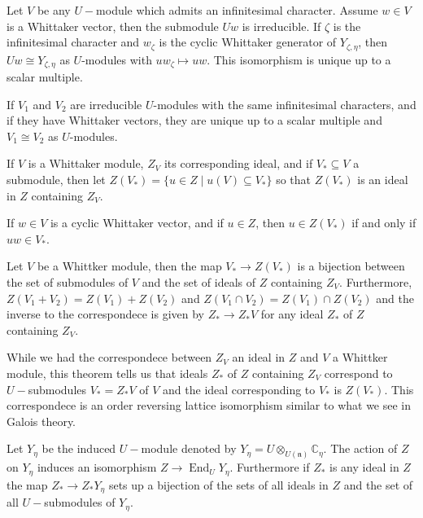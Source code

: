 \documentclass{article}
\DeclareMathOperator{\End}{End}
\theoremstyle{mytheoremstyle}
\theoremstyle{mytheoremstyle}
\theoremstyle{myproblemstyle}
\begin{document}
    \begin{theorem} 
    	Let $V$ be any $U-$module which admits an infinitesimal character. Assume $w \in V$ is a Whittaker vector, then 
	the submodule $Uw$ is irreducible. If $\zeta$ is the infinitesimal character and $w_\zeta$ is the cyclic 
	Whittaker generator of $Y_{\zeta,\eta}$, then $Uw \cong Y_{\zeta,\eta}$ as $U$-modules with $uw_\zeta \mapsto uw$.
	This isomorphism is unique up to a scalar multiple.

	If $V_1$ and $V_2$ are irreducible $U$-modules with the same infinitesimal characters, and if they have 
	Whittaker vectors, they are unique up to a scalar multiple and $V_1 \cong V_2$ as $U$-modules.
    \end{theorem}

    If $V$ is a Whittaker module, $Z_V$ its corresponding ideal, and if $V_* \subseteq V$ a submodule, then 
    let $Z(V_*) = \{u \in Z \mid u(V) \subseteq V_*\}$ so that $Z(V_*)$ is an ideal in $Z$ containing $Z_V$.

    \begin{remark}
    	If $w \in V$ is a cyclic Whittaker vector, and if $u \in Z$, then $u \in Z(V_*)$ if and only if $uw \in V_*$.
    \end{remark}
    
    \begin{theorem}
    	Let $V$ be a Whittker module, then the map $V_* \to Z(V_*)$ is a bijection between the set 
	of submodules of $V$ and the set of ideals of $Z$ containing $Z_V$. Furthermore, 
	$Z(V_1 + V_2) = Z(V_1) + Z(V_2)$ and $Z(V_1 \cap V_2) = Z(V_1) \cap Z(V_2)$ and the 
	inverse to the correspondece is given by $Z_* \to Z_*V$ for any ideal $Z_*$ of $Z$ containing $Z_V$.
    \end{theorem}

    \begin{remark}
    	While we had the correspondece between $Z_V$ an ideal in $Z$ and $V$ a Whittker module,
	this theorem tells us that ideals $Z_*$ of $Z$ containing $Z_V$ correspond to 
	$U-$submodules $V_* = Z_*V$ of $V$ and the ideal corresponding to $V_*$ is $Z(V_*)$.
	This correspondece is an order reversing lattice isomorphism similar to what we see in 
	Galois theory.
    \end{remark}
    
    \begin{theorem}[Corollary]
      Let $Y_\eta$ be the induced $U-$module denoted by $Y_\eta = U \otimes_{U(\mathfrak{n})} \mathbb{C}_\eta$.
      The action of $Z$ on $Y_\eta$ induces an isomorphism $Z \to \End_U Y_\eta$.
      Furthermore if $Z_*$ is any ideal in $Z$ the map $Z_* \to Z_*Y_\eta$ sets up a bijection of the sets 
      of all ideals in $Z$ and the set of all $U-$submodules of $Y_\eta$.
    \end{theorem}
\end{document}
